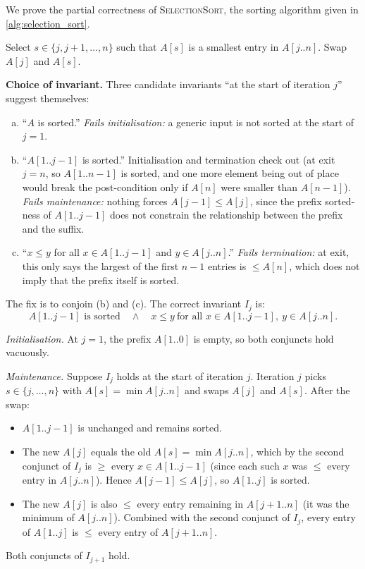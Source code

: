 \begin{example}
\label{ex:insertion_sort_correctness}
We prove the partial correctness of \textsc{SelectionSort}, the sorting algorithm given in \cref{alg:selection_sort}.

\begin{algorithm}
\caption{\textsc{SelectionSort}$(A[1..n])$.}
\label{alg:selection_sort}
\begin{algorithmic}[1]
    \State Select $s \in \{j, j+1, \dots, n\}$ such that $A[s]$ is a smallest entry in $A[j..n]$.
    \State Swap $A[j]$ and $A[s]$.
  \EndFor
\end{algorithmic}
\end{algorithm}

\noindent\textbf{Choice of invariant.} Three candidate invariants ``at the start of iteration $j$'' suggest themselves:
\begin{enumerate}[(a)]
  \item ``$A$ is sorted.'' \emph{Fails initialisation:} a generic input is not sorted at the start of $j = 1$.
  \item ``$A[1..j-1]$ is sorted.'' Initialisation and termination check out (at exit $j = n$, so $A[1..n-1]$ is sorted, and one more element being out of place would break the post-condition only if $A[n]$ were smaller than $A[n-1]$). \emph{Fails maintenance:} nothing forces $A[j-1] \le A[j]$, since the prefix sorted-ness of $A[1..j-1]$ does not constrain the relationship between the prefix and the suffix.
  \item ``$x \le y$ for all $x \in A[1..j-1]$ and $y \in A[j..n]$.'' \emph{Fails termination:} at exit, this only says the largest of the first $n-1$ entries is $\le A[n]$, which does not imply that the prefix itself is sorted.
\end{enumerate}
The fix is to conjoin (b) and (c). The correct invariant $I_j$ is:
\[
  \text{$A[1..j-1]$ is sorted}\quad \wedge \quad x \le y\ \text{for all } x \in A[1..j-1],\ y \in A[j..n].
\]

\medskip
\noindent\textit{Initialisation.} At $j = 1$, the prefix $A[1..0]$ is empty, so both conjuncts hold vacuously.

\medskip
\noindent\textit{Maintenance.} Suppose $I_j$ holds at the start of iteration $j$. Iteration $j$ picks $s \in \{j, \dots, n\}$ with $A[s] = \min A[j..n]$ and swaps $A[j]$ and $A[s]$. After the swap:
\begin{itemize}
  \item $A[1..j-1]$ is unchanged and remains sorted.
  \item The new $A[j]$ equals the old $A[s] = \min A[j..n]$, which by the second conjunct of $I_j$ is $\ge$ every $x \in A[1..j-1]$ (since each such $x$ was $\le$ every entry in $A[j..n]$). Hence $A[j-1] \le A[j]$, so $A[1..j]$ is sorted.
  \item The new $A[j]$ is also $\le$ every entry remaining in $A[j+1..n]$ (it was the minimum of $A[j..n]$). Combined with the second conjunct of $I_j$, every entry of $A[1..j]$ is $\le$ every entry of $A[j+1..n]$.
\end{itemize}
Both conjuncts of $I_{j+1}$ hold.


\end{example}

